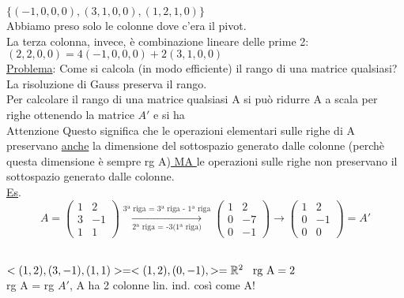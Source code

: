 $\{ (-1,0,0,0),(3,1,0,0),(1,2,1,0)\}$\\
\textsf{\small Abbiamo preso solo le colonne dove c'era il pivot.}\\
\textsf{\small La terza colonna, invece, è combinazione lineare delle prime 2:}\\
$(2,2,0,0) = 4(-1,0,0,0) + 2(3,1,0,0)$\\
\textsf{\underline{Problema}: Come si calcola (in modo efficiente) il rango di una matrice qualsiasi?}\\
\color{ForestGreen} \textsf{\small La risoluzione di Gauss preserva il rango.}\normalcolor \\
\textsf{\small Per calcolare il rango di una matrice qualsiasi A si può ridurre A a scala per righe ottenendo la matrice $A'$ e si ha }\\
$\boxed{\text{Attenzione}}$ \textsf{\small Questo significa che le operazioni elementari sulle righe di A preservano \underline{anche} la dimensione del sottospazio generato dalle colonne (perchè questa dimensione è sempre rg A)\underline{\underline{ MA }} le operazioni sulle righe non preservano il sottospazio generato dalle colonne.}\\
\enlargethispage{1\linewidth}
\textsf{\underline{Es}.}\\
\[
A =
\begin{pmatrix}
	1 & 2 \\
	3 & -1 \\
	1 & 1
\end{pmatrix}
\underset{\text{2ª riga = -3(1ª riga)}}{\overset{\text{3ª riga = 3ª riga - 1ª riga}}{\longrightarrow}}
\begin{pmatrix}
	1 & 2 \\
	0 & -7 \\
	0 & -1
\end{pmatrix}
\longrightarrow
\begin{pmatrix}
	1 & 2 \\
	0 & -1 \\
	0 & 0
\end{pmatrix}
= A'
\]\\

\newpage

\centering$<(1,2),(3,-1),(1,1)> = <(1,2),(0,-1),> = \mathbb{R}^2 \hspace{0.3cm} \text{rg A} = 2$\\

\textsf{\small rg A = rg $A'$, A ha 2 colonne lin. ind. così come A!}\\

